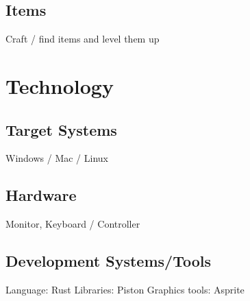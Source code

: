 \documentclass[a4paper]{scrreprt}
\begin{document}
\section{Items}
Craft / find items and level them up





\chapter{Technology}

\section{Target Systems}
Windows / Mac / Linux

\section{Hardware}
Monitor, Keyboard / Controller

\section{Development Systems/Tools}
Language: Rust
\newline Libraries: Piston
\newline Graphics tools: Asprite
\end{document}
